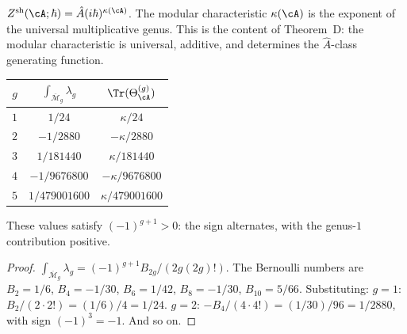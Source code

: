 \begin{remark}%
\label{rem:g1-ahat-power}%
%
$Z^{\mathrm{sh}}(\cA;\hbar) = \hat{A}(i\hbar)^{\kappa(\cA)}$.
The modular characteristic $\kappa(\cA)$ is the exponent of the
universal multiplicative genus.  This is the content of
Theorem~D: the modular characteristic is universal, additive,
and determines the $\hat{A}$-class generating function.
\end{remark}

\begin{proposition}%
\label{prop:g1-scalar-shadow-values}%
%
\begin{center}
\renewcommand{\arraystretch}{1.4}
\begin{tabular}{c|c|c}
$g$ & $\int_{\overline{\mathcal{M}}_g} \lambda_g$ &
  $\Tr(\Theta_\cA^{(g)})$
\\[2pt]\hline\hline
$1$ & $1/24$ & $\kappa/24$ \\
$2$ & $-1/2880$ & $-\kappa/2880$ \\
$3$ & $1/181440$ & $\kappa/181440$ \\
$4$ & $-1/9676800$ & $-\kappa/9676800$ \\
$5$ & $1/479001600$ & $\kappa/479001600$
\end{tabular}
\end{center}
These values satisfy $(-1)^{g+1} > 0$: the
sign alternates, with the genus-$1$ contribution positive.
\end{proposition}

\begin{proof}
$\int_{\overline{\mathcal{M}}_g} \lambda_g =
(-1)^{g+1} B_{2g}/(2g(2g)!)$.  The Bernoulli numbers are
$B_2 = 1/6$, $B_4 = -1/30$, $B_6 = 1/42$,
$B_8 = -1/30$, $B_{10} = 5/66$.  Substituting:
$g = 1$: $B_2/(2 \cdot 2!) = (1/6)/4 = 1/24$.
$g = 2$: $-B_4/(4 \cdot 4!) = (1/30)/96 = 1/2880$,
with sign $(-1)^3 = -1$.  And so on.
\end{proof}

